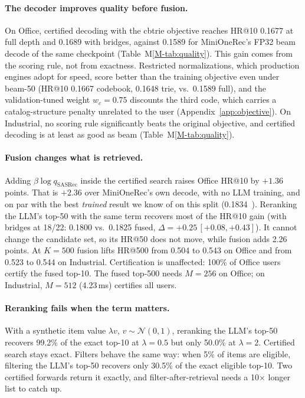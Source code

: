 \documentclass[sigconf,anonymous]{acmart}
\begin{document}
\paragraph{The decoder improves quality before fusion.} On Office, certified decoding with the cbtrie objective
reaches HR@10 0.1677 at full depth and 0.1689 with bridges, against 0.1589 for MiniOneRec's FP32 beam decode of
the same checkpoint (Table~M\ref{M-tab:quality}). This gain comes from the scoring rule, not from exactness. Restricted
normalizations, which production engines adopt for speed, score better than the training objective even under
beam-50 (HR@10 0.1667 codebook, 0.1648 trie, vs.\ 0.1589 full), and the validation-tuned weight
$w_c=0.75$ discounts the third code, which carries a catalog-structure penalty unrelated to the user
(Appendix~\ref{app:objective}). On Industrial, no scoring rule significantly beats the original objective,
and certified decoding is at least as good as beam (Table~M\ref{M-tab:quality}).

\paragraph{Fusion changes what is retrieved.} Adding $\beta\log q_{\text{SASRec}}$ inside the certified search
raises Office HR@10 by $+1.36$ points. That is $+2.36$ over MiniOneRec's own decode, with no LLM training, and
on par with the best \emph{trained} result we know of on this split (0.1834~\cite{ax2608.20611}). Reranking the
LLM's top-50 with the same term recovers most of the HR@10 gain (with bridges at 18/22: 0.1800 vs.\ 0.1825 fused,
$\Delta=+0.25\,[+0.08,+0.43]$). It cannot change the candidate set, so its HR@50 does not move, while fusion adds
2.26 points. At $K=500$ fusion lifts HR@500 from 0.504 to 0.543 on
Office and from 0.523 to 0.544 on Industrial. Certification is unaffected: 100\% of Office users certify the
fused top-10. The fused top-500 needs $M=256$ on Office; on Industrial, $M=512$ (4.23\,ms) certifies all users.

\paragraph{Reranking fails when the term matters.} With a synthetic item value $\lambda v$, $v\sim\mathcal N(0,1)$,
reranking the LLM's top-50 recovers 99.2\% of the exact top-10 at $\lambda=0.5$ but only 50.0\% at $\lambda=2$.
Certified search stays exact. Filters behave the same way: when 5\% of items are eligible, filtering the LLM's
top-50 recovers only 30.5\% of the exact eligible top-10. Two certified forwards return it exactly, and
filter-after-retrieval needs a 10$\times$ longer list to catch up.
\end{document}
